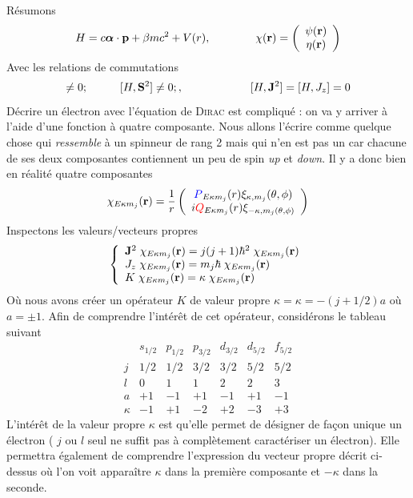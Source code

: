 Résumons
\begin{equation}
H = 
c  \mbox{\boldmath $ \alpha $} \cdot  {\bf p}
 + \beta m c^2 + V(r),\qquad\qquad
 \chi ({\bf r}) = \left( \begin{array}{c}
  \psi({\bf r}) \\ \eta({\bf r}) \end{array} \right)
\end{equation}
Avec les relations de commutations
\begin{equation}
[H, {\bf L}^2 ] \neq 0; \hspace*{1cm}  [H, {\bf S}^2 ] \neq 0;,\qquad\qquad\qquad
[H, {\bf J}^2 ] = [H, J_z] = 0
\end{equation}
Décrire un électron avec l'équation de \textsc{Dirac} est compliqué : on va y arriver à l'aide d'une
fonction à quatre composante. Nous allons l'écrire comme quelque chose qui \textit{ressemble} à un
spinneur de rang 2 mais qui n'en est pas un car chacune de ses deux composantes contiennent un peu
de spin \textit{up} et \textit{down}. Il y a donc bien en réalité quatre composantes
\begin{equation}
\chi_{E \kappa m_j} ({\bf r}) =\frac{1}{r} \left( \begin{array}{c}
 {\color{blue} P}_{E \kappa m_j}(r) \xi_{\kappa,m_j}(\theta, \phi) \\ 
 i {\color{red} Q}_{E \kappa m_j} (r)  \xi_{- \kappa, m_j (\theta, \phi)} 
\end{array} \right) 
\end{equation}
Inspectons les valeurs/vecteurs propres
\begin{equation}
\left\{
\begin{array}{l}
{\bf J}^2 \; \chi_{E \kappa m_j} ({\bf r}) = j(j+1) \hbar^2  \; \chi_{E \kappa m_j} ({\bf r})\\
J_z \; \chi_{E \kappa m_j} ({\bf r}) = m_j  \hbar \; \chi_{E \kappa m_j} ({\bf r}) \\
K \; \chi_{E \kappa m_j} ({\bf r}) = \kappa \; \chi_{E \kappa m_j} ({\bf r})
\end{array} \right.
\end{equation}
Où nous avons créer un opérateur $K$ de valeur propre $\kappa = \kappa = -(j+1/2)a$ où $a=\pm1$. 
Afin de comprendre l'intérêt de cet opérateur, considérons le tableau suivant
\begin{equation}
\begin{array}{lcccccc}
  & s_{1/2} & p_{1/2} & p_{3/2} & d_{3/2} & d_{5/2} & f_{5/2}  \\
j & 1/2 & 1/2 & 3/2 & 3/2 & 5/2 & 5/2 \\
l & 0 & 1 & 1 & 2 & 2 & 3 \\
a & +1 & -1 & +1 & -1 & +1 & -1 \\
\kappa & -1 & +1 & -2 & +2 & -3 & +3
\end{array}
\end{equation}
L'intérêt de la valeur propre $\kappa$ est qu'elle permet de désigner de façon unique un électron (
$j$ ou $l$ seul ne suffit pas à complètement caractériser un électron). Elle permettra également de
comprendre l'expression du vecteur propre décrit ci-dessus où l'on voit apparaître $\kappa$ dans la
première composante et $-\kappa$ dans la seconde.

